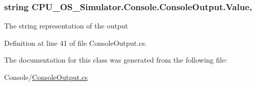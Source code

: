 \subsubsection[{Value}]{\setlength{\rightskip}{0pt plus 5cm}string C\+P\+U\+\_\+\+O\+S\+\_\+\+Simulator.\+Console.\+Console\+Output.\+Value\hspace{0.3cm}{\ttfamily [get]}, {\ttfamily [set]}}\label{class_c_p_u___o_s___simulator_1_1_console_1_1_console_output_a1a5c833114630e4739546948e8622cbd}


The string representation of the output 



Definition at line 41 of file Console\+Output.\+cs.



The documentation for this class was generated from the following file\+:\begin{DoxyCompactItemize}
\item 
Console/\hyperlink{_console_output_8cs}{Console\+Output.\+cs}\end{DoxyCompactItemize}
